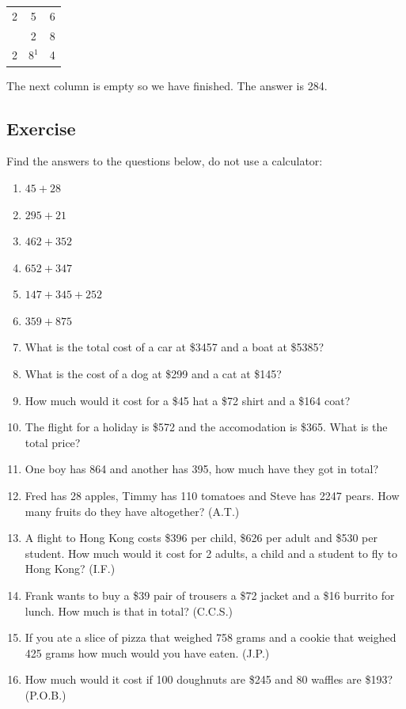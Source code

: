 \renewcommand{\arraystretch}{1}
\begin{tabular}{c c c}
	2 & 5 & 6 \\
	  & 2 & 8 \\
	\hline \hline
	2  & $8^1$  & 4  \\
\end{tabular}

The next column is empty so we have finished.  The answer is 284.
\subsection{Exercise}
Find the answers to the questions below, do not use a calculator:
\begin{multicols}{2}
\begin{enumerate}
  \item $45 + 28$
  \item $295 + 21$
  \item $462 + 352$
  \item $652 + 347$
  \item $147 + 345 + 252$
  \item $359 + 875$
  \item What is the total cost of a car at \$3457 and a boat at \$5385?
  \item What is the cost of a dog at \$299 and a cat at \$145?
  \item How much would it cost for a \$45 hat a \$72 shirt and a \$164 coat?
  \item The flight for a holiday is \$572 and the accomodation is \$365.  What is the total price?
  \item One boy has 864\cent \hspace{1 mm} and another has 395\cent, how much have they got in total?
  \item Fred has 28 apples, Timmy has 110 tomatoes and Steve has 2247 pears. How many fruits do they have altogether? (A.T.)
  \item A flight to Hong Kong costs \$396 per child, \$626 per adult and \$530 per student. How much would it cost for 2 adults, a child and a student to fly to Hong Kong? (I.F.)
  \item Frank wants to buy a \$39 pair of trousers a \$72 jacket and a \$16 burrito for lunch. How much is that in total? (C.C.S.)
  \item If you ate a slice of pizza that weighed 758 grams and a cookie that weighed 425 grams how much would you have eaten. (J.P.)
  \item How much would it cost if 100 doughnuts are \$245 and 80 waffles are \$193? (P.O.B.)

\end{enumerate}
\end{multicols}
